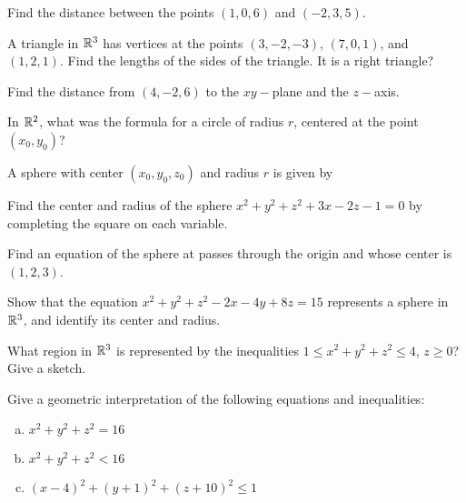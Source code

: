 \documentclass[notes]{subfiles}
\begin{document}
		\begin{ex}
			Find the distance between the points $(1,0,6)$ and $(-2,3,5)$.
		\end{ex}
		
		\begin{ex}
			A triangle in $\mathbb{R}^3$ has vertices at the points $(3,-2,-3)$, $(7,0,1)$, and $(1,2,1)$.  Find the lengths of the sides of the triangle.  It is a right triangle?
		\end{ex}	
			\newpage
			
		\begin{ex}
			Find the distance from $(4,-2,6)$ to the $xy-$plane and the $z-$axis.
		\end{ex}
			
		\begin{question}
			In $\mathbb{R}^2$, what was the formula for a circle of radius $r$, centered at the point $(x_0,y_0)$?
		\end{question}
			
		\begin{rmk}
			A sphere with center $(x_0,y_0,z_0)$ and radius $r$ is given by\\[15pt]
				\[\]
		\end{rmk}
		
		\begin{ex}
			Find the center and radius of the sphere $x^2 + y^2 + z^2 + 3x - 2z -1 = 0$ by completing the square on each variable.
		\end{ex}
			
		\begin{ex}
			Find an equation of the sphere at passes through the origin and whose center is $(1,2,3)$.
		\end{ex}
			
		\begin{ex}
			Show that the equation $x^2 + y^2 + z^2 - 2x - 4y + 8z = 15$ represents a sphere in $\mathbb{R}^3$, and identify its center and radius.
		\end{ex}
			\newpage
			
		\begin{ex}
			What region in $\mathbb{R}^3$ is represented by the inequalities $1\leq x^2 + y^2 + z^2\leq 4$, $z\geq 0$?  Give a sketch.
		\end{ex}
			
		\begin{ex}
			Give a geometric interpretation of the following equations and inequalities:
			\begin{enumerate}[(a)]
				\item $x^2 + y^2 + z^2 = 16$
					
				\item $x^2 + y^2 + z^2 < 16$
					
				\item $(x-4)^2 + (y+1)^2 + (z+10)^2 \leq 1$
			\end{enumerate}	
		\end{ex}
		
\end{document}
